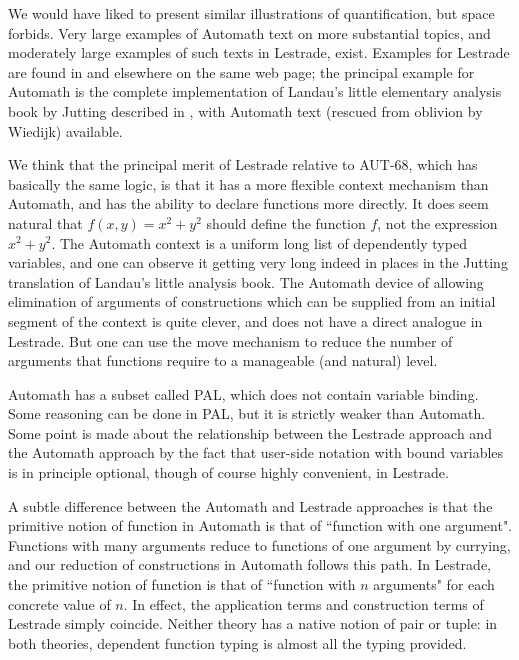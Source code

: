 \documentclass{article}
\begin{document}
We would have liked to present similar illustrations of quantification, but space forbids.  Very large examples of Automath text on more substantial topics, and moderately large examples of such texts in Lestrade, exist.  Examples for Lestrade are found in \cite{lestrademanual} and elsewhere on the same web page;  the principal example for Automath is the complete implementation of Landau's little elementary analysis book \cite{landau} by Jutting described in \cite{jutting}, with Automath text \cite{grundlagen} (rescued from oblivion by Wiedijk) available.

We think that the principal merit of Lestrade relative to AUT-68, which has basically the same logic, is that it has a more flexible context mechanism than Automath, and has the ability to declare functions more directly.  It does seem natural that $f(x,y)=x^2+y^2$ should define the function $f$, not the expression $x^2+y^2$.   The Automath context is a uniform long list of dependently typed variables, and one can observe it getting very long indeed in places in the Jutting translation of Landau's little analysis book.  The Automath device of allowing elimination of arguments of constructions which can be supplied from an initial segment of the context is quite clever, and does not have a direct analogue in Lestrade.  But one can use the move mechanism to reduce the number of arguments that functions require to a manageable (and natural) level.

Automath has a subset called PAL, which does not contain variable binding.  Some reasoning can be done in PAL, but it is strictly weaker than Automath.
Some point is made about the relationship between the Lestrade approach and the Automath approach by the fact that user-side notation with bound variables is in principle optional, though of course highly convenient, in Lestrade.

A subtle difference between the Automath and Lestrade approaches is that the primitive notion of function in Automath is that of ``function with one argument".  Functions with many arguments reduce to functions of one argument by currying, and our reduction of constructions in Automath follows this path.  In Lestrade, the primitive notion of function is that of ``function with $n$ arguments" for each concrete value of $n$.  In effect, the application terms and construction terms of Lestrade simply coincide.  Neither theory has a native notion
of pair or tuple:  in both theories, dependent function typing is almost all the typing provided.
\end{document}
